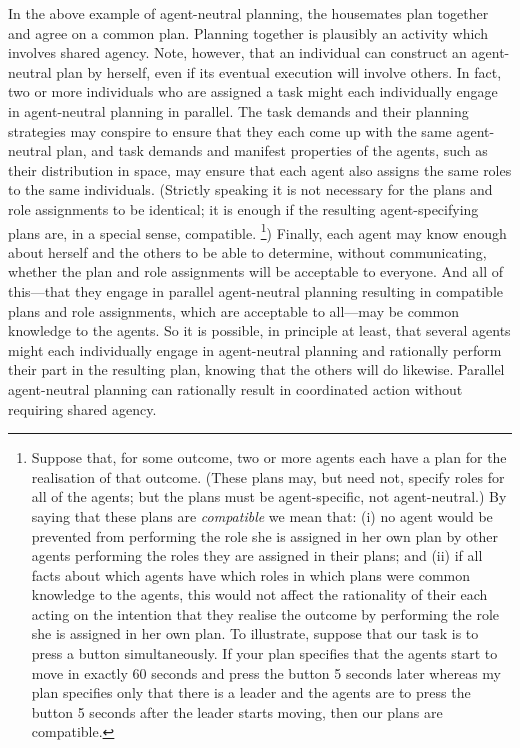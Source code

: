 \documentclass[12pt,\papersize]{extarticle}
\begin{document}
In the above example of agent-neutral planning,
	the housemates plan together and agree on a common plan.
	Planning together is plausibly an activity which involves shared agency.
	Note, however, that an individual can construct an agent-neutral plan by herself, even if its eventual execution will involve others.
	In fact, two or more individuals who are assigned a task might each individually engage in agent-neutral planning in parallel.
	The task demands and their planning strategies may conspire to ensure that they each come up with the same agent-neutral plan, and task demands and manifest properties of the agents, such as their distribution in space, may ensure that each agent also assigns the same roles to the same individuals.
(Strictly speaking it is not necessary for the plans and role assignments to be identical; it is enough if the resulting agent-specifying plans are, in a special sense, compatible.%
\footnote{
\label{fn:df_compatible}
Suppose that, for some outcome, two or more agents each have a plan for the realisation of that outcome. 
(These plans may, but need not, specify roles for all of the agents; but the plans must be agent-specific, not agent-neutral.)
By saying that these plans are \emph{compatible} we mean that:
(i) 
no agent would be prevented from performing the role she is assigned in her own plan by other agents performing the roles they are assigned in their plans;
and
(ii)
if all facts about which agents have which roles in which plans were common knowledge to the agents,
this would not affect the rationality of their each acting on the intention that they realise the outcome by performing the role she is assigned in her own plan.
To illustrate, suppose that our task is to press a button simultaneously. 
If your plan specifies that the agents start to move in exactly 60 seconds and press the button 5 seconds later whereas my plan specifies only that there is a leader and the agents are to press the button 5 seconds after the  leader starts moving, then our plans are compatible.
})
%
Finally, each agent may know enough about herself and the others to be able to determine, without communicating, whether the plan and role assignments will be acceptable to everyone. 
	And all of this---that they engage in parallel agent-neutral planning resulting in compatible plans and role assignments, which are acceptable to all---may be common knowledge to the agents.
	So it is possible, in principle at least, 
	that several agents might each individually engage in agent-neutral planning and rationally perform their part in the resulting plan, knowing that the others will do likewise.
	Parallel agent-neutral planning can rationally result in coordinated action without requiring shared agency.
\end{document}
